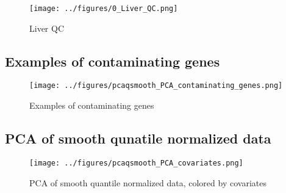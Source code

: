 \documentclass{article}
\begin{document}
\begin{figure}[htbp]
  \centering
  \texttt{[image: ../figures/0\_Liver\_QC.png]}
  \caption{Liver QC}
  \label{fig:0_Liver_QC}
\end{figure}

\FloatBarrier
\subsection{Examples of contaminating genes}
\begin{figure}[htbp]
  \centering
  \texttt{[image: ../figures/pcaqsmooth\_PCA\_contaminating\_genes.png]}
  \caption{Examples of contaminating genes}
  \label{fig:contaminating_genes}
\end{figure}

\subsection{PCA of smooth qunatile normalized data}
\begin{figure}[htbp]
  \centering
  \texttt{[image: ../figures/pcaqsmooth\_PCA\_covariates.png]}
  \caption{PCA of smooth quantile normalized data, colored by covariates}
  \label{fig:pca_covariates}
\end{figure}


\FloatBarrier



\end{document}
